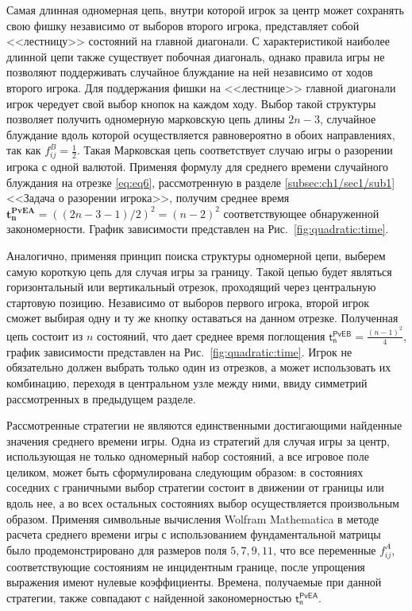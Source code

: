 Самая длинная одномерная цепь, внутри которой игрок за центр может сохранять свою фишку независимо от выборов второго игрока, 
представляет собой <<лестницу>> состояний на главной диагонали. С характеристикой наиболее длинной цепи также существует побочная диагональ, однако
правила игры не позволяют поддерживать случайное блуждание на ней независимо от ходов второго игрока. 
Для поддержания фишки на <<лестнице>> главной диагонали игрок чередует свой выбор кнопок на каждом ходу.
Выбор такой структуры позволяет получить одномерную марковскую 
цепь длины $2n-3$, случайное блуждание вдоль которой осуществляется равновероятно в обоих направлениях, так как $f_{ij}^B=\frac{1}{2}$.
Такая Марковская цепь соответствует случаю игры о разорении игрока с одной валютой. Применяя формулу для среднего времени случайного блуждания на отрезке \eqref{eq:eq6},
рассмотренную в разделе \cref{subsec:ch1/sec1/sub1} <<Задача о разорении игрока>>, получим среднее время $\boldsymbol{t_n^{PvE A}} = ((2n-3-1)/2)^2 = (n-2)^2$ соответствующее обнаруженной закономерности.
График зависимости представлен на Рис.~\cref{fig:quadratic:time}.

Аналогично, применяя принцип поиска структуры одномерной цепи, выберем самую короткую цепь для случая игры за границу.
Такой цепью будет являться горизонтальный или вертикальный отрезок, проходящий через центральную стартовую позицию.
Независимо от выборов первого игрока, второй игрок сможет выбирая одну и ту же кнопку оставаться на данном отрезке.
Полученная цепь состоит из $n$ состояний, что дает среднее время поглощения $\boldsymbol{\mathsf{t_n^{PvE B}}} = \frac{(n-1)^2}{4}$, 
график зависимости представлен на Рис.~\cref{fig:quadratic:time}.
Игрок не обязательно должен выбрать только один из отрезков, а может использовать их комбинацию, переходя в центральном узле между ними,
ввиду симметрий рассмотренных в предыдущем разделе. 

Рассмотренные стратегии не являются единственными достигающими найденные значения среднего времени игры. 
Одна из стратегий для случая игры за центр, использующая не только одномерный набор состояний, а все игровое поле целиком, 
может быть сформулирована следующим образом: в состояниях соседних с граничными выбор стратегии состоит в движении от границы или вдоль нее, 
а во всех остальных состояниях выбор осуществляется произвольным образом. Применяя символьные вычисления Wolfram Mathematica
в методе расчета среднего времени игры с использованием фундаментальной матрицы было продемонстрировано для размеров поля
$5, 7, 9, 11$, что все переменные $f_{ij}^A$, соответствующие состояниям не инцидентным границе, после упрощения выражения имеют нулевые коэффициенты.
Времена, получаемые при данной стратегии, также совпадают с найденной закономерностью $\boldsymbol{\mathsf{t_n^{PvE A}}}$.

